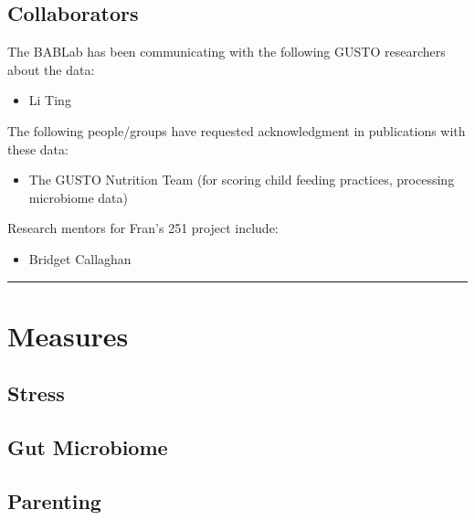 \documentclass[
]{book}
\providecommand{\tightlist}{%
  \setlength{\itemsep}{0pt}\setlength{\parskip}{0pt}}
\begin{document}
\hypertarget{collaborators}{%
\subsection{Collaborators}\label{collaborators}}

The BABLab has been communicating with the following GUSTO researchers about the data:

\begin{itemize}
\tightlist
\item
  Li Ting
\end{itemize}

The following people/groups have requested acknowledgment in publications with these data:

\begin{itemize}
\tightlist
\item
  The GUSTO Nutrition Team (for scoring child feeding practices, processing microbiome data)
\end{itemize}

Research mentors for Fran's 251 project include:

\begin{itemize}
\tightlist
\item
  Bridget Callaghan
\end{itemize}

\begin{center}\rule{0.5\linewidth}{0.5pt}\end{center}

\hypertarget{measures}{%
\section{Measures}\label{measures}}

\hypertarget{stress}{%
\subsection{Stress}\label{stress}}

\hypertarget{gut-microbiome}{%
\subsection{Gut Microbiome}\label{gut-microbiome}}

\hypertarget{parenting}{%
\subsection{Parenting}\label{parenting}}
\end{document}
